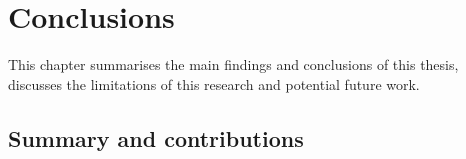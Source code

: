

\chapter{\label{ch:8-conclusions}Conclusions} 

This chapter summarises the main findings and conclusions of this thesis, discusses the limitations of this research and potential future work.

\section{Summary and contributions}

